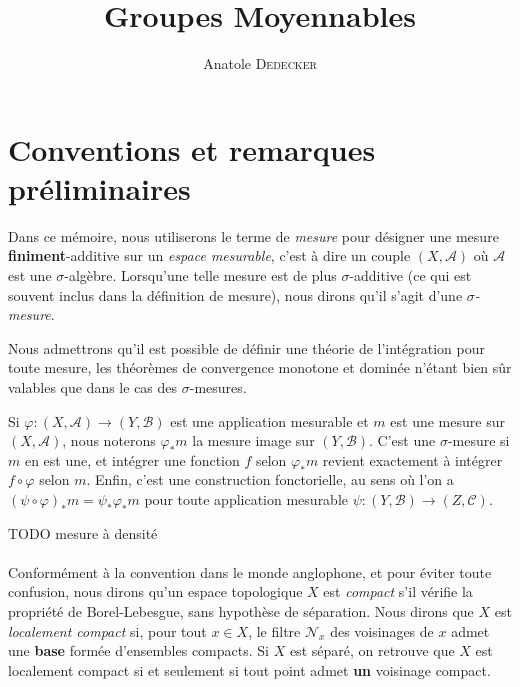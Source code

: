 \documentclass[a4paper,12pt]{article}
\newcommand{\ssi}{si et seulement si }
\newcommand{\comp}{\circ}
\newcommand{\nhds}{\mathcal{N}}
\begin{document}
\begin{titlepage}
\title{Groupes Moyennables}
\author{Anatole \textsc{Dedecker}}
\maketitle
\thispagestyle{empty}
\end{titlepage}

\tableofcontents
\thispagestyle{empty}

\clearpage


\section*{Conventions et remarques préliminaires}

Dans ce mémoire, nous utiliserons le terme de \textit{mesure} pour désigner une mesure \textbf{finiment}-additive sur un 
\textit{espace mesurable}, c'est à dire un couple $(X, \mathcal{A})$ où $\mathcal{A}$ est une $\sigma$-algèbre. 
Lorsqu'une telle mesure est de plus $\sigma$-additive (ce qui est souvent inclus dans la définition de \og{}mesure\fg{}),
nous dirons qu'il s'agit d'une \textit{$\sigma$-mesure}. 

Nous admettrons qu'il est possible de définir une théorie de l'intégration pour toute mesure, les théorèmes de convergence
monotone et dominée n'étant bien sûr valables que dans le cas des $\sigma$-mesures. 

Si $\varphi:(X,\mathcal{A})\to(Y,\mathcal{B})$ est une application mesurable et $m$ est une mesure sur $(X, \mathcal{A})$, 
nous noterons $\varphi_*m$ la mesure image sur $(Y, \mathcal{B})$. C'est une $\sigma$-mesure si $m$ en est une, et intégrer 
une fonction $f$ selon $\varphi_*m$ revient exactement à intégrer $f\comp\varphi$ selon $m$. Enfin, c'est une construction
fonctorielle, au sens où l'on a $(\psi\comp\varphi)_*m = \psi_*\varphi_*m$ pour toute application mesurable 
$\psi : (Y, \mathcal{B})\to(Z, \mathcal{C})$. 

TODO mesure à densité

\paragraph{}

Conformément à la convention dans le monde anglophone, et pour éviter toute confusion, nous dirons qu'un espace topologique
$X$ est \emph{compact} s'il vérifie la propriété de Borel-Lebesgue, sans hypothèse de séparation. 
Nous dirons que $X$ est \emph{localement compact} si, pour tout $x\in X$, le filtre $\nhds_x$ des voisinages de $x$ admet
une \textbf{base} formée d'ensembles compacts. Si $X$ est séparé, on retrouve que $X$ est localement compact 
\ssi tout point admet \textbf{un} voisinage compact.
\end{document}

